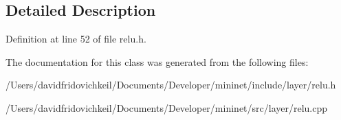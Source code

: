 \subsection{Detailed Description}


Definition at line 52 of file relu.\+h.



The documentation for this class was generated from the following files\+:\begin{DoxyCompactItemize}
\item 
/\+Users/davidfridovichkeil/\+Documents/\+Developer/mininet/include/layer/relu.\+h\item 
/\+Users/davidfridovichkeil/\+Documents/\+Developer/mininet/src/layer/relu.\+cpp\end{DoxyCompactItemize}
